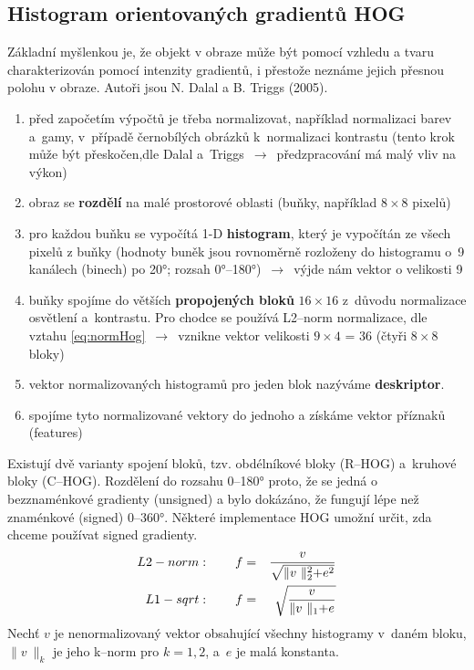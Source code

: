 \subsection{Histogram orientovaných gradientů HOG}
Základní myšlenkou je, že objekt v obraze může být pomocí vzhledu a tvaru charakterizován pomocí intenzity gradientů, i přestože neznáme jejich přesnou polohu v obraze. Autoři jsou N. Dalal a B. Triggs (2005).
\begin{enumerate}
  \item před započetím výpočtů je třeba normalizovat, například normalizaci barev a~gamy, v~případě černobílých obrázků k~normalizaci kontrastu (tento krok může být přeskočen,dle Dalal a~Triggs $\,\to\,$ předzpracování má malý vliv na výkon)
  \item obraz se \textbf{rozdělí} na malé prostorové oblasti (buňky, například $8 \times 8$ pixelů)
  \item pro každou buňku se vypočítá 1-D \textbf{histogram}, který je vypočítán ze všech pixelů z buňky (hodnoty buněk jsou rovnoměrně rozloženy do histogramu o~9 kanálech (binech) po \ang{20}; rozsah \ang{0}--\ang{180})  $\,\to\,$ výjde nám vektor o velikosti 9
  \item buňky spojíme do větších \textbf{propojených bloků} $16 \times 16$ z~důvodu normalizace osvětlení a~kontrastu. Pro chodce se používá L2--norm normalizace, dle vztahu \eqref{eq:normHog} $\,\to\,$ vznikne vektor velikosti $9\times4$ = 36 (čtyři $8 \times 8$ bloky)
  \item vektor normalizovaných histogramů pro jeden blok nazýváme \textbf{deskriptor}.
  \item spojíme tyto normalizované vektory do jednoho a získáme  vektor příznaků (features)
\end{enumerate}
Existují dvě varianty spojení bloků, tzv. obdélníkové bloky (R--HOG) a~kruhové bloky (C--HOG).
Rozdělení do rozsahu 0--\ang{180} proto, že se jedná o bezznaménkové gradienty (unsigned) a bylo dokázáno, že fungují lépe než znaménkové (signed) 0--\ang{360}. Některé implementace HOG umožní určit, zda chceme používat signed gradienty.
\begin{equation}
\centering
 \label{eq:normHog}
 \begin{aligned}
L2-norm&: \qquad  f =& \frac{v}{\sqrt{\lVert v~\lVert_2^2 + e^2}} \\
L1-sqrt&: \qquad  f =& \sqrt{\frac{v}{\lVert v~\lVert_1 + e}}
 \end{aligned}
\end{equation}
Nechť $v$ je nenormalizovaný vektor obsahující všechny histogramy v~daném bloku, $\lVert v~\lVert_k$ je jeho k--norm pro $k = 1,2$, a~$e$ je malá konstanta.


